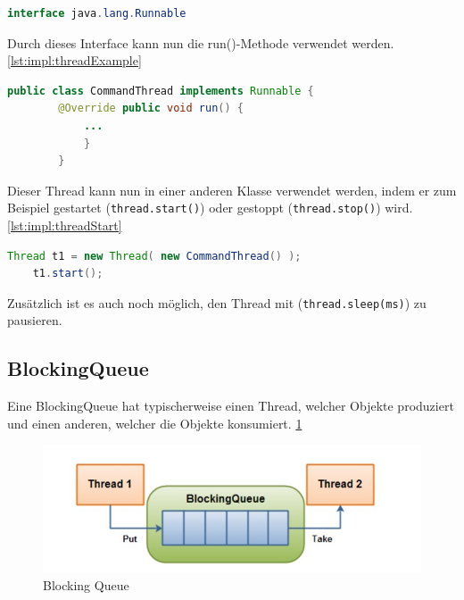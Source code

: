 \begin{lstlisting}[language=java,caption=Java Runnable,label=lst:impl:javaRunnable]
    interface java.lang.Runnable
\end{lstlisting}
 
Durch dieses Interface kann nun die run()-Methode verwendet werden. \ref{lst:impl:threadExample}
 
\begin{lstlisting}[language=java,caption=Einfaches Thread Beispiel,label=lst:impl:threadExample]
    public class CommandThread implements Runnable { 
        @Override public void run() {   
            ...
            }
        }
\end{lstlisting}
 
Dieser Thread kann nun in einer anderen Klasse verwendet werden, indem er zum Beispiel gestartet (\texttt{thread.start()}) oder gestoppt (\texttt{thread.stop()}) wird. \ref{lst:impl:threadStart}
 
\begin{lstlisting}[language=java,caption=Thread erstellen/starten,label=lst:impl:threadStart]
    Thread t1 = new Thread( new CommandThread() );
    t1.start();
\end{lstlisting}
 
Zusätzlich ist es auch noch möglich, den Thread mit (\texttt{thread.sleep(ms)}) zu pausieren.
 
\subsection{BlockingQueue}
 
Eine BlockingQueue hat typischerweise einen Thread, welcher Objekte produziert und einen anderen, welcher die Objekte konsumiert. \ref{fig:impl:BlockingQueue}
 
\begin{figure}[h t]
    \centering
    \includegraphics[scale=0.5]{pics/blockingQueue.jpg}
    \caption{Blocking Queue}
    \label{fig:impl:BlockingQueue}
\end{figure}
 
